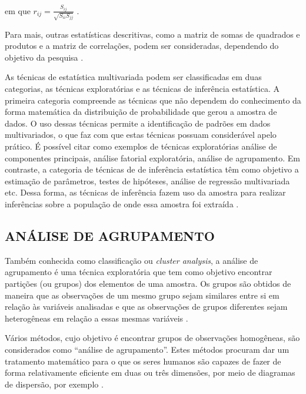\documentclass[
	12pt,				%
	openright,			%
	oneside,			%
	a4paper,			%
	chapter=TITLE,		%
	section=TITLE,		%
	english,			%
	french,				%
	spanish,			%
	brazil				%
	]{abntex2}
\begin{document}
\noindent em que $r_{ij} = \frac{S_{ij}}{\sqrt{S_{ii} S_{jj}}}$ \cite{ferreira11}.  

\vspace{0.15cm} %

Para mais, outras estatísticas descritivas, como a matriz de somas de quadrados e produtos e a matriz de correlações, podem ser consideradas, dependendo do objetivo da pesquisa \cite{ferreira11}.

As técnicas de estatística multivariada podem ser classificadas em duas categorias, as técnicas exploratórias e as técnicas de inferência estatística. A primeira categoria compreende as técnicas que não dependem do conhecimento da forma matemática da distribuição de probabilidade que gerou a amostra de dados. O uso dessas técnicas permite a identificação de padrões em dados multivariados, o que faz com que estas técnicas possuam considerável apelo prático. É possível citar como exemplos de técnicas exploratórias análise de componentes principais, análise fatorial exploratória, análise de agrupamento. Em contraste, a categoria de técnicas de de inferência estatística têm como objetivo a estimação de parâmetros, testes de hipóteses, análise de regressão multivariada etc.  Dessa forma, as técnicas de inferência fazem uso da amostra para realizar inferências sobre a população de onde essa amostra foi extraída \cite{mingoti10}.

\subsection{ANÁLISE DE AGRUPAMENTO}

Também conhecida como classificação ou \textit{cluster analysis}, a análise de agrupamento é uma técnica exploratória que tem como objetivo encontrar partições (ou grupos) dos elementos de uma amostra. Os grupos são obtidos de maneira que as observações de um mesmo grupo sejam similares entre si em relação às variáveis analisadas e que as observações de grupos diferentes sejam heterogêneas em relação a essas mesmas variáveis \cite{mingoti10}.

Vários métodos, cujo objetivo é encontrar grupos de observações homogêneas, são considerados como ``análise de agrupamento''. Estes métodos procuram dar um tratamento matemático para o que os seres humanos são capazes de fazer de forma relativamente eficiente em duas ou três dimensões, por meio de diagramas de dispersão, por exemplo \cite{everitt11}. 

\end{document}
